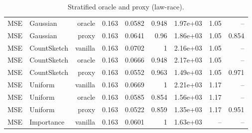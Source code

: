 \begin{table}[t]
\begin{tabular}{llrrrrrrr}
MSE & Gaussian & oracle & 0.163 & 0.0582 & 0.948 & 1.97e+03 & 1.05 & -- \\
MSE & Gaussian & proxy & 0.163 & 0.0641 & 0.96 & 1.86e+03 & 1.05 & 0.854 \\
MSE & CountSketch & vanilla & 0.163 & 0.0702 & 1 & 2.16e+03 & 1.05 & -- \\
MSE & CountSketch & oracle & 0.163 & 0.0666 & 0.948 & 2.17e+03 & 1.05 & -- \\
MSE & CountSketch & proxy & 0.163 & 0.0552 & 0.963 & 1.49e+03 & 1.05 & 0.971 \\
MSE & Uniform & vanilla & 0.163 & 0.0669 & 1 & 2.21e+03 & 1.17 & -- \\
MSE & Uniform & oracle & 0.163 & 0.0585 & 0.854 & 1.56e+03 & 1.17 & -- \\
MSE & Uniform & proxy & 0.163 & 0.0522 & 0.859 & 1.35e+03 & 1.17 & 0.951 \\
MSE & Importance & vanilla & 0.163 & 0.0601 & 1 & 1.63e+03 & -- & -- \\
\bottomrule
\end{tabular}
\caption{Stratified oracle and proxy (law-race).}
\label{tab:strat_law-race}
\end{table}